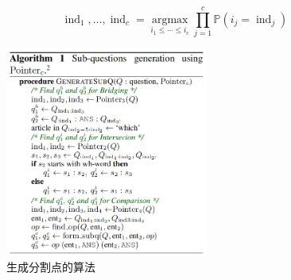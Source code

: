 \documentclass[a4paper,UTF8]{article}
\numberwithin{equation}{section}
\begin{document}
\begin{equation}
\operatorname{ind}_{1}, \ldots, \operatorname{ind}_{c}=\underset{i_{1} \leq \cdots \leq i_{c}}{\operatorname{argmax}} \prod_{j=1}^{c} \mathbb{P}\left(i_{j}=\operatorname{ind}_{j}\right)
\end{equation}
\begin{figure}[H]
	\centering
	\includegraphics[width=0.6\textwidth]{8-3.png}
	\caption{生成分割点的算法}
\end{figure}

\newpage
\end{document}
